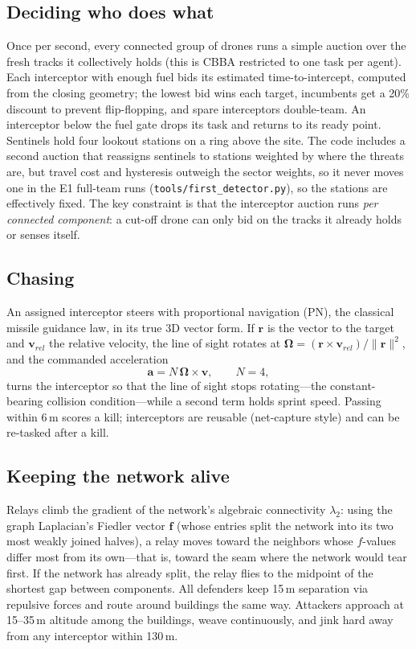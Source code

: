 \documentclass[10pt,twocolumn]{article}
\begin{document}
\subsection{Deciding who does what}
Once per second, every connected group of drones runs a simple auction over
the fresh tracks it collectively holds (this is CBBA restricted to one task
per agent). Each interceptor with enough fuel bids its estimated
time-to-intercept, computed from the closing geometry; the lowest bid wins
each target, incumbents get a 20\% discount to prevent flip-flopping, and
spare interceptors double-team. An interceptor below the fuel gate drops
its task and returns to its ready point. Sentinels hold four lookout
stations on a ring above the site. The code includes a second auction that
reassigns sentinels to stations weighted by where the threats are, but travel
cost and hysteresis outweigh the sector weights, so it never moves one in
the E1 full-team runs (\texttt{tools/first\_detector.py}), so the stations are effectively fixed.
The key constraint is that the interceptor auction runs \emph{per connected
component}: a cut-off drone can only bid on the tracks it already holds or
senses itself.

\subsection{Chasing}
An assigned interceptor steers with proportional navigation (PN), the
classical missile guidance law, in its true 3D vector form. If
$\mathbf{r}$ is the vector to the target and $\mathbf{v}_{rel}$ the
relative velocity, the line of sight rotates at
$\boldsymbol{\Omega} = (\mathbf{r}\times\mathbf{v}_{rel})/\|\mathbf{r}\|^2$,
and the commanded acceleration
\[
\mathbf{a} = N\,\boldsymbol{\Omega}\times\mathbf{v}, \qquad N = 4,
\]
turns the interceptor so that the line of sight stops rotating---the
constant-bearing collision condition---while a second term holds sprint
speed. Passing within 6\,m scores a kill; interceptors are reusable
(net-capture style) and can be re-tasked after a kill.

\subsection{Keeping the network alive}
Relays climb the gradient of the network's algebraic connectivity
$\lambda_2$: using the graph Laplacian's Fiedler vector $\mathbf{f}$ (whose
entries split the network into its two most weakly joined halves), a relay
moves toward the neighbors whose $f$-values differ most from its own---that
is, toward the seam where the network would tear first. If the network has
already split, the relay flies to the midpoint of the shortest gap between
components. All defenders keep 15\,m separation via repulsive forces and
route around buildings the same way. Attackers approach at 15--35\,m
altitude among the buildings, weave continuously, and jink hard away from
any interceptor within 130\,m.
\end{document}
